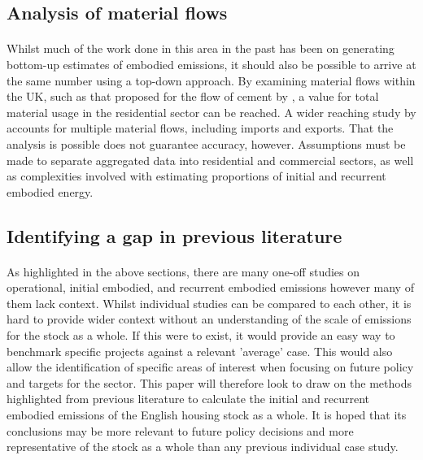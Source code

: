 \documentclass[12pt]{article}
\begin{document}
\subsection{Analysis of material flows}
\label{materialflows}

\paragraph{}
Whilst much of the work done in this area in the past has been on generating bottom-up estimates of embodied emissions, it should also be possible to arrive at the same number using a top-down approach. By examining material flows within the UK, such as that proposed for the flow of cement by \citet{Shanks2019-nu}, a value for total material usage in the residential sector can be reached. A wider reaching study by \citet{Sheerin2002-aj} accounts for multiple material flows, including imports and exports. That the analysis is possible does not guarantee accuracy, however. Assumptions must be made to separate aggregated data into residential and commercial sectors, as well as complexities involved with estimating proportions of initial and recurrent embodied energy.

\subsection{Identifying a gap in previous literature}

\paragraph{}
As highlighted in the above sections, there are many one-off studies on operational, initial embodied, and recurrent embodied emissions however many of them lack context. Whilst individual studies can be compared to each other, it is hard to provide wider context without an understanding of the scale of emissions for the stock as a whole. If this were to exist, it would provide an easy way to benchmark specific projects against a relevant 'average' case. This would also allow the identification of specific areas of interest when focusing on future policy and targets for the sector. This paper will therefore look to draw on the methods highlighted from previous literature to calculate the initial and recurrent embodied emissions of the English housing stock as a whole. It is hoped that its conclusions may be more relevant to future policy decisions and more representative of the stock as a whole than any previous individual case study.
\end{document}
